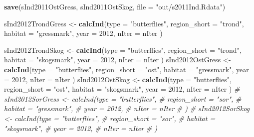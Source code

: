 \documentclass[]{article}
\newenvironment{Shaded}{\begin{snugshade}}{\end{snugshade}}
\newcommand{\KeywordTok}[1]{\textcolor[rgb]{0.13,0.29,0.53}{\textbf{#1}}}
\newcommand{\DataTypeTok}[1]{\textcolor[rgb]{0.13,0.29,0.53}{#1}}
\newcommand{\DecValTok}[1]{\textcolor[rgb]{0.00,0.00,0.81}{#1}}
\newcommand{\StringTok}[1]{\textcolor[rgb]{0.31,0.60,0.02}{#1}}
\newcommand{\CommentTok}[1]{\textcolor[rgb]{0.56,0.35,0.01}{\textit{#1}}}
\newcommand{\NormalTok}[1]{#1}
\begin{document}
\begin{Shaded}
\begin{Highlighting}[]
\KeywordTok{save}\NormalTok{(sInd2011OstGress, sInd2011OstSkog, }\DataTypeTok{file =} \StringTok{"out/s2011Ind.Rdata"}\NormalTok{)}
\end{Highlighting}
\end{Shaded}

\begin{Shaded}
\begin{Highlighting}[]
\NormalTok{sInd2012TrondGress <-}\StringTok{ }\KeywordTok{calcInd}\NormalTok{(}\DataTypeTok{type =} \StringTok{"butterflies"}\NormalTok{,}
                              \DataTypeTok{region_short =} \StringTok{"trond"}\NormalTok{,}
                              \DataTypeTok{habitat =} \StringTok{"gressmark"}\NormalTok{,}
                              \DataTypeTok{year =} \DecValTok{2012}\NormalTok{,}
                              \DataTypeTok{nIter =}\NormalTok{ nIter}
\NormalTok{                              )}
       
\NormalTok{sInd2012TrondSkog <-}\StringTok{ }\KeywordTok{calcInd}\NormalTok{(}\DataTypeTok{type =} \StringTok{"butterflies"}\NormalTok{,}
                              \DataTypeTok{region_short =} \StringTok{"trond"}\NormalTok{,}
                              \DataTypeTok{habitat =} \StringTok{"skogsmark"}\NormalTok{,}
                              \DataTypeTok{year =} \DecValTok{2012}\NormalTok{,}
                              \DataTypeTok{nIter =}\NormalTok{ nIter}
\NormalTok{                              )}
\NormalTok{sInd2012OstGress <-}\StringTok{ }\KeywordTok{calcInd}\NormalTok{(}\DataTypeTok{type =} \StringTok{"butterflies"}\NormalTok{,}
                              \DataTypeTok{region_short =} \StringTok{"ost"}\NormalTok{,}
                              \DataTypeTok{habitat =} \StringTok{"gressmark"}\NormalTok{,}
                              \DataTypeTok{year =} \DecValTok{2012}\NormalTok{,}
                              \DataTypeTok{nIter =}\NormalTok{ nIter}
\NormalTok{                              )}
\NormalTok{sInd2012OstSkog <-}\StringTok{ }\KeywordTok{calcInd}\NormalTok{(}\DataTypeTok{type =} \StringTok{"butterflies"}\NormalTok{,}
                              \DataTypeTok{region_short =} \StringTok{"ost"}\NormalTok{,}
                              \DataTypeTok{habitat =} \StringTok{"skogsmark"}\NormalTok{,}
                              \DataTypeTok{year =} \DecValTok{2012}\NormalTok{,}
                              \DataTypeTok{nIter =}\NormalTok{ nIter}
\NormalTok{                              )}
\CommentTok{# sInd2012SorGress <- calcInd(type = "butterflies",}
\CommentTok{#                               region_short = "sor",}
\CommentTok{#                               habitat = "gressmark",}
\CommentTok{#                               year = 2012,}
\CommentTok{#                               nIter = nIter}
\CommentTok{#                               )}
\CommentTok{# sInd2012SorSkog <- calcInd(type = "butterflies",}
\CommentTok{#                               region_short = "sor",}
\CommentTok{#                               habitat = "skogsmark",}
\CommentTok{#                               year = 2012,}
\CommentTok{#                               nIter = nIter}
\CommentTok{#                               )}


\end{Highlighting}
\end{Shaded}
\end{document}
